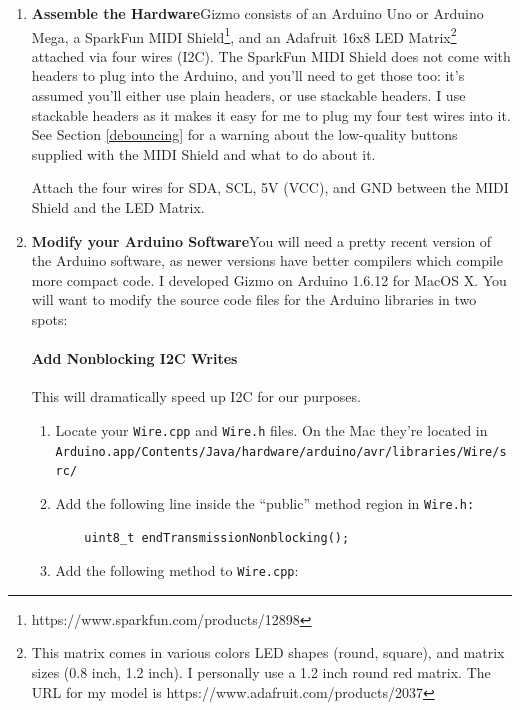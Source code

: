 \documentclass{article}
\begin{document}
\begin{enumerate}

\item {\bf Assemble the Hardware}\quad Gizmo consists of an Arduino Uno or Arduino Mega, a SparkFun MIDI Shield\footnote{https:/\!/www.sparkfun.com/products/12898}, and an Adafruit 16x8 LED Matrix\footnote{This matrix comes in various colors LED shapes (round, square), and matrix sizes (0.8 inch, 1.2 inch).  I personally use a 1.2 inch round red matrix.  The URL for my model is https:/\!/www.adafruit.com/products/2037} attached via four wires (I2C).  The SparkFun MIDI Shield does not come with headers to plug into the Arduino, and you'll need to get those too: it's assumed you'll either use plain headers, or use stackable headers.  I use stackable headers as it makes it easy for me to plug my four test wires into it.  See Section \ref{debouncing} for a warning about the low-quality buttons supplied with the MIDI Shield and what to do about it.

Attach the four wires for SDA, SCL, 5V (VCC), and GND between the MIDI Shield and the LED Matrix.  

\item {\bf Modify your Arduino Software}\quad You will need a pretty recent version of the Arduino software, as newer versions have better compilers which compile more compact code.  I developed Gizmo on Arduino 1.6.12 for MacOS X.  You will want to modify the source code files for the Arduino libraries in two spots:

\paragraph{Add Nonblocking I2C Writes}  This will dramatically speed up I2C for our purposes.
\begin{enumerate}
\item Locate your \texttt{Wire.cpp} and \texttt{Wire.h} files.  On the Mac they're located in\\\texttt{Arduino.app/Contents/Java/hardware/arduino/avr/libraries/Wire/src/}

\item Add the following line inside the ``public'' method region in \texttt{Wire.h:}

\begin{verbatim}
    uint8_t endTransmissionNonblocking();
\end{verbatim}

\item Add the following method to \texttt{Wire.cpp}:


\end{enumerate}
\end{enumerate}
\end{document}
